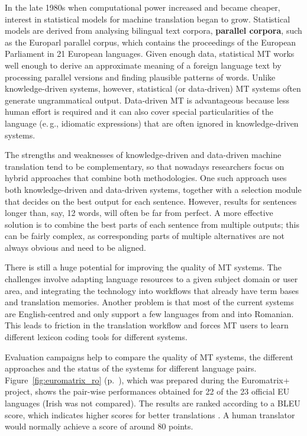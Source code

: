 \begin{multicols}{2}
In the late 1980s when computational power increased and became cheaper, interest in statistical models for machine translation began to grow. Statistical models are derived from analysing bilingual text corpora, \textbf{parallel corpora}, such as the Europarl parallel corpus, which contains the proceedings of the European Parliament in 21 European languages. Given enough data, statistical MT works well enough to derive an approximate meaning of a foreign language text by processing parallel versions and finding plausible patterns of words. Unlike knowledge-driven systems, however, statistical (or data-driven) MT systems often generate ungrammatical output. Data-driven MT is advantageous because less human effort is required and it can also cover special particularities of the language (e.\,g., idiomatic expressions) that are often ignored in knowledge-driven systems. 

The strengths and weaknesses of knowledge-driven and data-driven machine translation tend to be complementary, so that nowadays researchers focus on hybrid approaches that combine both methodologies. One such approach uses both knowledge-driven and data-driven systems, together with a selection module that decides on the best output for each sentence. However, results for sentences longer than, say, 12 words, will often be far from perfect. A more effective solution is to combine the best parts of each sentence from multiple outputs; this can be fairly complex, as corresponding parts of multiple alternatives are not always obvious and need to be aligned. 

There is still a huge potential for improving the quality of MT systems. The challenges involve adapting language resources to a given subject domain or user area, and integrating the technology into workflows that already have term bases and translation memories. Another problem is that most of the current systems are English-centred and only support a few languages from and into Romanian. This leads to friction in the translation workflow and forces MT users to learn different lexicon coding tools for different systems.

Evaluation campaigns help to compare the quality of MT systems, the different approaches and the status of the systems for different language pairs. Figure~\ref{fig:euromatrix_ro} (p.~\pageref{fig:euromatrix_ro}), which was prepared during the Euromatrix+ project, shows the pair-wise performances obtained for 22 of the 23 official EU languages (Irish was not compared). The results are ranked according to a BLEU score, which indicates higher scores for better translations \cite{bleu1}. A human translator would normally achieve a score of around 80 points.


\end{multicols}
